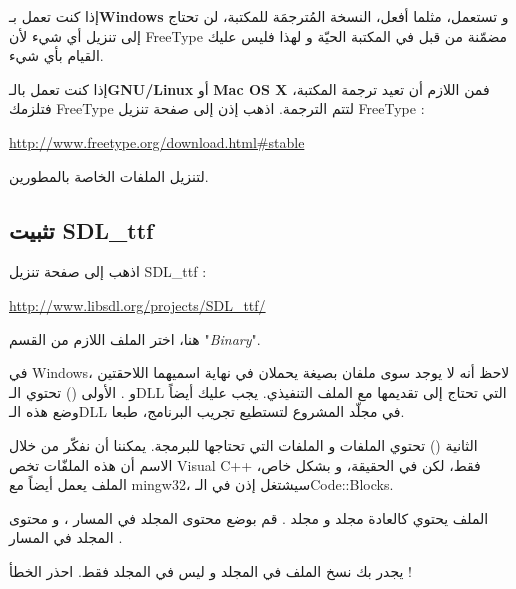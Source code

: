 إذا كنت تعمل بـ\textbf{\textenglish{Windows}}
و تستعمل، مثلما أفعل، النسخة المُترجمَة للمكتبة، لن تحتاج إلى تنزيل أي شيء لأن
\textenglish{FreeType}
مضمّنة من قبل في المكتبة الحيّة
و لهذا فليس عليك القيام بأي شيء.

إذا كنت تعمل بالـ\textbf{\textenglish{GNU/Linux}}
أو
\textbf{\textenglish{Mac OS X}}
فمن اللازم أن تعيد ترجمة المكتبة، فتلزمك
\textenglish{FreeType}
لتتم الترجمة. اذهب إذن إلى صفحة تنزيل
\textenglish{FreeType} :

\url{http://www.freetype.org/download.html#stable}

لتنزيل الملفات الخاصة بالمطورين.

\subsection{تثبيت \textenglish{SDL\_ttf}}

اذهب إلى  صفحة تنزيل 
\textenglish{SDL\_ttf} :

\url{http://www.libsdl.org/projects/SDL_ttf/}

هنا، اختر الملف اللازم من القسم
"\textit{\textenglish{Binary}}".

\begin{information}
في
\textenglish{Windows}،
 لاحظ أنه لا يوجد سوى ملفان بصيغة 
يحملان في نهاية اسميهما اللاحقتين
و
.
الأولى 
()
تحتوي الـ\textenglish{DLL}
التي تحتاج إلى تقديمها مع الملف التنفيذي. يجب عليك أيضاً وضع هذه الـ\textenglish{DLL}
في مجلّد المشروع لتستطيع تجريب البرنامج، طبعا.

الثانية 
()
تحتوي الملفات 
و الملفات
التي تحتاجها للبرمجة. يمكننا أن نفكّر من خلال الاسم أن هذه الملفّات تخص
\textenglish{Visual C++}
فقط، لكن في الحقيقة، و بشكل خاص، الملف
يعمل أيضاً مع
\textenglish{mingw32}،
سيشتغل إذن في الـ\textenglish{Code::Blocks}.
\end{information}

الملف
يحتوي كالعادة مجلد
و مجلد
.
قم بوضع محتوى المجلد
في المسار
،
و محتوى المجلد
في المسار 
.

\begin{warning}
 يجدر بك نسخ الملف
في المجلد
و ليس في المجلد 
فقط. احذر الخطأ !
\end{warning}

